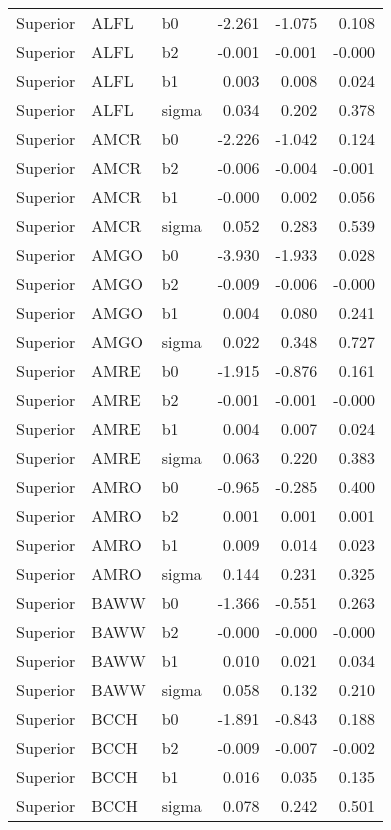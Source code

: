 \begin{table}[ht]
\begin{center}
\begin{tabular}{lllrrr}
  Superior & ALFL & b0 & -2.261 & -1.075 & 0.108 \\ 
  Superior & ALFL & b2 & -0.001 & -0.001 & -0.000 \\ 
  Superior & ALFL & b1 & 0.003 & 0.008 & 0.024 \\ 
  Superior & ALFL & sigma & 0.034 & 0.202 & 0.378 \\ 
  Superior & AMCR & b0 & -2.226 & -1.042 & 0.124 \\ 
  Superior & AMCR & b2 & -0.006 & -0.004 & -0.001 \\ 
  Superior & AMCR & b1 & -0.000 & 0.002 & 0.056 \\ 
  Superior & AMCR & sigma & 0.052 & 0.283 & 0.539 \\ 
  Superior & AMGO & b0 & -3.930 & -1.933 & 0.028 \\ 
  Superior & AMGO & b2 & -0.009 & -0.006 & -0.000 \\ 
  Superior & AMGO & b1 & 0.004 & 0.080 & 0.241 \\ 
  Superior & AMGO & sigma & 0.022 & 0.348 & 0.727 \\ 
  Superior & AMRE & b0 & -1.915 & -0.876 & 0.161 \\ 
  Superior & AMRE & b2 & -0.001 & -0.001 & -0.000 \\ 
  Superior & AMRE & b1 & 0.004 & 0.007 & 0.024 \\ 
  Superior & AMRE & sigma & 0.063 & 0.220 & 0.383 \\ 
  Superior & AMRO & b0 & -0.965 & -0.285 & 0.400 \\ 
  Superior & AMRO & b2 & 0.001 & 0.001 & 0.001 \\ 
  Superior & AMRO & b1 & 0.009 & 0.014 & 0.023 \\ 
  Superior & AMRO & sigma & 0.144 & 0.231 & 0.325 \\ 
  Superior & BAWW & b0 & -1.366 & -0.551 & 0.263 \\ 
  Superior & BAWW & b2 & -0.000 & -0.000 & -0.000 \\ 
  Superior & BAWW & b1 & 0.010 & 0.021 & 0.034 \\ 
  Superior & BAWW & sigma & 0.058 & 0.132 & 0.210 \\ 
  Superior & BCCH & b0 & -1.891 & -0.843 & 0.188 \\ 
  Superior & BCCH & b2 & -0.009 & -0.007 & -0.002 \\ 
  Superior & BCCH & b1 & 0.016 & 0.035 & 0.135 \\ 
  Superior & BCCH & sigma & 0.078 & 0.242 & 0.501 \\ 

\end{tabular}
\end{center}
\end{table}

